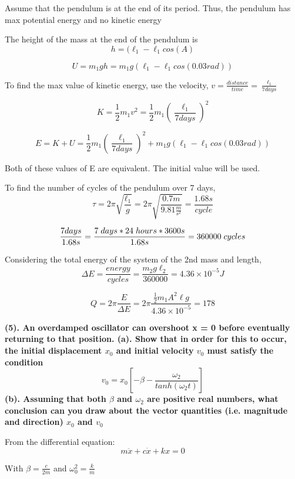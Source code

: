 \documentclass[12pt]{article}
\begin{document}
Assume that the pendulum is at the end of its period. 
Thus, the pendulum has max potential energy and no kinetic energy

The height of the mass at the end of the pendulum is
$$
h = (\ell_1 - \ell_1 cos(A)
$$

$$
U = m_1 g h = m_1 g (\ell_1 - \ell_1 cos(0.03 rad))
$$

To find the max value of kinetic energy, use the velocity, $v = \frac{distance}{time} = \frac{\ell_1}{7 days}$

$$
K = \frac{1}{2} m_1 v^2 = \frac{1}{2} m_1 (\frac{\ell_1}{7 days})^2
$$

$$
E = K + U = \frac{1}{2} m_1 (\frac{\ell_1}{7 days})^2 + m_1 g (\ell_1 - \ell_1 cos(0.03 rad))
$$

Both of these values of E are equivalent. The initial value will be used.

To find the number of cycles of the pendulum over 7 days,
$$
\tau = 2 \pi \sqrt{\frac{\ell_1}{g}} = 2 \pi \sqrt{\frac{0.7 m}{ 9.81 \frac{m}{s^2}}} = \frac{1.68 s}{cycle}
$$

$$
\frac{7 days}{1.68s} = \frac{7\hspace{0.1cm} days * 24\hspace{0.1cm} hours * 3600 s}{1.68 s} = 360000\hspace{0.1cm} cycles
$$

Considering the total energy of the system of the 2nd mass and length,
$$
\Delta E = \frac{energy}{cycles} = \frac{m_2 g \ell_2}{360000} = 4.36 \times 10^{-5} J
$$

$$
Q = 2 \pi \frac{E}{\Delta E} = 2 \pi \frac{\frac{1}{2} m_1 A^2 \ell g}{4.36 \times 10^{-5}} = 178
$$

\newpage
\textbf{
(5). An overdamped oscillator can overshoot x = 0 before eventually returning to
that position. \newline
(a). Show that in order for this to occur, the initial displacement $x_0$ and initial velocity $v_0$ must satisfy the condition \newline
$$
v_0 = x_0 [-\beta - \frac{\omega_2}{tanh(\omega_2 t)}]
$$
(b). Assuming that both $\beta$ and $\omega_2$ are positive real numbers, what conclusion can you
draw about the vector quantities (i.e. magnitude and direction) $x_0$ and $v_0$ \newline
}



From the differential equation:
$$
m \ddot{x} + c \dot{x} + k x = 0
$$

With $\beta = \frac{c}{2m}$ and $\omega_0^2 = \frac{k}{m}$
\end{document}
